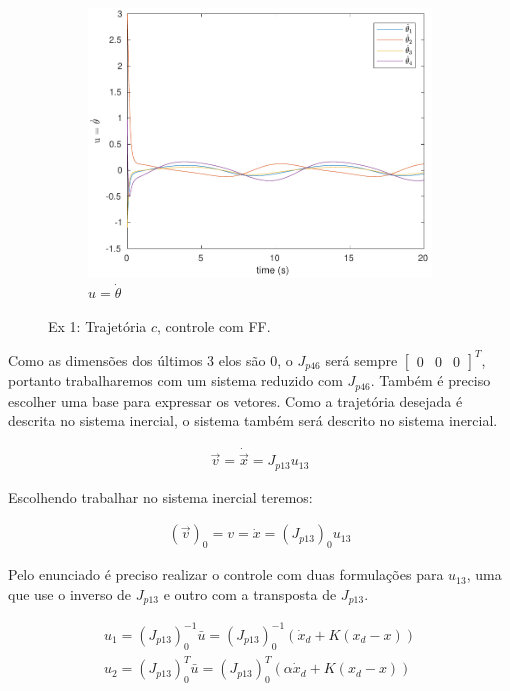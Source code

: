 \documentclass[a4paper,11pt]{article}
\theoremstyle{mytheor}
\begin{document}
\begin{figure}[!ht]
\begin{minipage}{\linewidth}
    \begin{subfigure}[b]{0.45\textwidth}
    \includegraphics[width=1\textwidth]{figs/ex1_c_1_dq.pdf}
    \caption{$u = \dot{\theta}$}
    \label{fig:ex1_c_1_dq}
    \end{subfigure}
  \end{minipage}
\caption{Ex 1: Trajetória $c$, controle com FF.}
\label{fig:ex1_c_1}
\end{figure}

Como as dimensões dos últimos 3 elos são 0, o $J_{p46}$ será sempre $\begin{bmatrix}0 & 0 & 0\end{bmatrix}^T$, portanto trabalharemos com um sistema reduzido com $J_{p46}$. Também é preciso escolher uma base para expressar os vetores. Como a trajetória desejada é descrita no sistema inercial, o sistema também será descrito no sistema inercial.

\begin{gather*}
\vec{v} = \dot{\vec{x}} = J_{p13}u_{13}
\end{gather*}

Escolhendo trabalhar no sistema inercial teremos:

\begin{gather*}
(\vec{v})_0 = v = \dot{x} = (J_{p13})_0u_{13}
\end{gather*}

Pelo enunciado é preciso realizar o controle com duas formulações para $u_{13}$, uma que use o inverso de $J_{p13}$ e outro com a transposta de $J_{p13}$.

\begin{gather*}
u_{1} = (J_{p13})_0^{-1}\bar{u} = (J_{p13})_0^{-1}(\dot{x}_d + K(x_d - x)) \\
u_{2} = (J_{p13})_0^T\bar{u} = (J_{p13})_0^T(\alpha\dot{x}_d + K(x_d - x))
\end{gather*}
\end{document}
